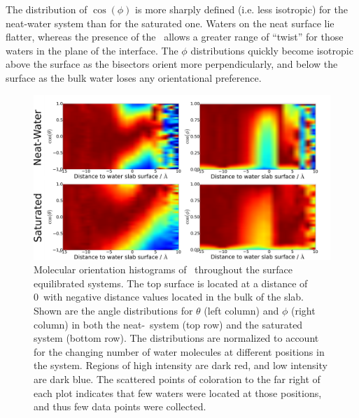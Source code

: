 The distribution of $\cos(\phi)$ is more sharply defined (i.e. less isotropic) for the neat-water system than for the saturated one. Waters on the neat surface lie flatter, whereas the presence of the \suldiox~allows a greater range of ``twist'' for those waters in the plane of the interface. The $\phi$ distributions quickly become isotropic above the surface as the bisectors orient more perpendicularly, and below the surface as the bulk water loses any orientational preference.


\begin{figure}[h!]
	\begin{center}
		\includegraphics[scale=1.0]{images/h2o-angles/h2oangles.png}
		\caption{Molecular orientation histograms of \wat~throughout the surface equilibrated systems. The top surface is located at a distance of 0\angs~with negative distance values located in the bulk of the slab. Shown are the angle distributions for $\theta$ (left column) and $\phi$ (right column) in both the neat-\wat~system (top row) and the saturated system (bottom row). The distributions are normalized to account for the changing number of water molecules at different positions in the system. Regions of high intensity are dark red, and low intensity are dark blue. The scattered points of coloration to the far right of each plot indicates that few waters were located at those positions, and thus few data points were collected.}
		\label{fig:water-orientation}
	\end{center}
\end{figure}


